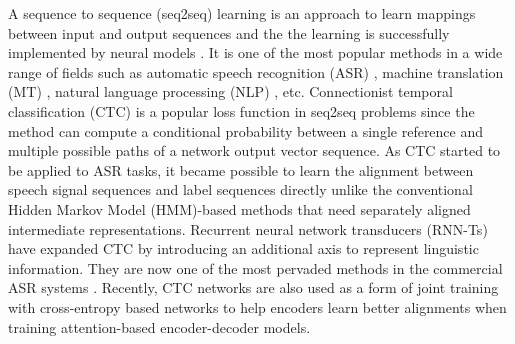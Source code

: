 \documentclass[review]{elsarticle}
\begin{document}
A sequence to sequence (seq2seq) learning is an approach to learn mappings between input and output sequences and the the learning is successfully implemented by neural models \citep{DBLP:conf/nips/SutskeverVL14}.
It is one of the most popular methods in a wide range of fields such as automatic speech recognition (ASR) \citep{DBLP:conf/icassp/ChanJLV16, DBLP:conf/icassp/HeSPMAZRKWPLBSL19, DBLP:conf/asru/KimJLHKLGPKJLYK19, DBLP:conf/asru/MoritzHR19}, machine translation (MT) \citep{DBLP:journals/corr/BahdanauCB14, DBLP:conf/interspeech/JiaWBMJCW19}, natural language processing (NLP) \citep{DBLP:conf/ijcai/YinJLSLL16}, etc.
Connectionist temporal classification (CTC) \citep{DBLP:conf/icml/GravesFGS06} is a popular loss function in seq2seq problems since the method can compute a conditional probability between a single reference and multiple possible paths of a network output vector sequence.
As CTC started to be applied to ASR tasks, it became possible to learn the alignment between speech signal sequences and label sequences directly unlike the conventional Hidden Markov Model (HMM)-based methods \citep{18626} that need separately aligned intermediate representations.
Recurrent neural network transducers (RNN-Ts) \citep{DBLP:conf/icassp/GravesMH13} have expanded CTC by introducing an additional axis to represent linguistic information. They are now one of the most pervaded methods in the commercial ASR systems \citep{DBLP:conf/icassp/HeSPMAZRKWPLBSL19}.
Recently, CTC networks are also used as a form of joint training \citep{DBLP:conf/asru/KimJLHKLGPKJLYK19, DBLP:conf/asru/MoritzHR19} with cross-entropy based networks to help encoders learn better alignments when training attention-based encoder-decoder models.
\end{document}

